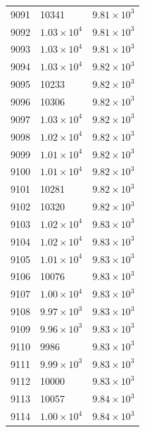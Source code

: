 \begin{table}[H]
\begin{tabular}{lll}
9091 & 10341 & $\displaystyle 9.81 \times 10^{3}$ \\
9092 & $\displaystyle 1.03 \times 10^{4}$ & $\displaystyle 9.81 \times 10^{3}$ \\
9093 & $\displaystyle 1.03 \times 10^{4}$ & $\displaystyle 9.81 \times 10^{3}$ \\
9094 & $\displaystyle 1.03 \times 10^{4}$ & $\displaystyle 9.82 \times 10^{3}$ \\
9095 & 10233 & $\displaystyle 9.82 \times 10^{3}$ \\
9096 & 10306 & $\displaystyle 9.82 \times 10^{3}$ \\
9097 & $\displaystyle 1.03 \times 10^{4}$ & $\displaystyle 9.82 \times 10^{3}$ \\
9098 & $\displaystyle 1.02 \times 10^{4}$ & $\displaystyle 9.82 \times 10^{3}$ \\
9099 & $\displaystyle 1.01 \times 10^{4}$ & $\displaystyle 9.82 \times 10^{3}$ \\
9100 & $\displaystyle 1.01 \times 10^{4}$ & $\displaystyle 9.82 \times 10^{3}$ \\
9101 & 10281 & $\displaystyle 9.82 \times 10^{3}$ \\
9102 & 10320 & $\displaystyle 9.82 \times 10^{3}$ \\
9103 & $\displaystyle 1.02 \times 10^{4}$ & $\displaystyle 9.83 \times 10^{3}$ \\
9104 & $\displaystyle 1.02 \times 10^{4}$ & $\displaystyle 9.83 \times 10^{3}$ \\
9105 & $\displaystyle 1.01 \times 10^{4}$ & $\displaystyle 9.83 \times 10^{3}$ \\
9106 & 10076 & $\displaystyle 9.83 \times 10^{3}$ \\
9107 & $\displaystyle 1.00 \times 10^{4}$ & $\displaystyle 9.83 \times 10^{3}$ \\
9108 & $\displaystyle 9.97 \times 10^{3}$ & $\displaystyle 9.83 \times 10^{3}$ \\
9109 & $\displaystyle 9.96 \times 10^{3}$ & $\displaystyle 9.83 \times 10^{3}$ \\
9110 & 9986 & $\displaystyle 9.83 \times 10^{3}$ \\
9111 & $\displaystyle 9.99 \times 10^{3}$ & $\displaystyle 9.83 \times 10^{3}$ \\
9112 & 10000 & $\displaystyle 9.83 \times 10^{3}$ \\
9113 & 10057 & $\displaystyle 9.84 \times 10^{3}$ \\
9114 & $\displaystyle 1.00 \times 10^{4}$ & $\displaystyle 9.84 \times 10^{3}$ \\

\end{tabular}
\end{table}
